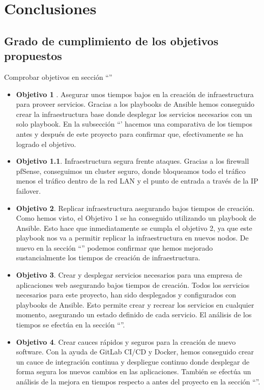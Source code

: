 \chapter {Conclusiones}

\section{Grado de cumplimiento de los objetivos propuestos}
\begin{text}
	Comprobar objetivos en sección ``''
\end{text}
\begin{itemize}
        \item \textbf{Objetivo 1 }. Asegurar unos tiempos bajos en la creación de infraestructura para proveer servicios. Gracias a los playbooks de Ansible hemos conseguido crear la infraestructura base donde desplegar los servicios necesarios con un solo playbook. En la subsección ``' hacemos una comparativa de los tiempos antes y después de este proyecto para confirmar que, efectivamente se ha logrado el objetivo.
        \item \textbf{Objetivo 1.1}. Infraestructura segura frente ataques. Gracias a los firewall pfSense, conseguimos un cluster seguro, donde bloqueamos todo el tráfico menos el tráfico dentro de la red LAN y el punto de entrada a través de la IP failover. 
        \item \textbf{Objetivo 2}. Replicar infraestructura asegurando bajos tiempos de creación. Como hemos visto, el Objetivo 1 se ha conseguido utilizando un playbook de Ansible. Esto hace que inmediatamente se cumpla el objetivo 2, ya que este playbook nos va a permitir replicar la infraestructura en nuevos nodos. De nuevo en la sección ``'' podemos confirmar que hemos mejorado sustancialmente los tiempos de creación de infraestructura.
        \item \textbf{Objetivo 3}. Crear y desplegar servicios necesarios para una empresa de aplicaciones web asegurando bajos tiempos de creación. Todos los servicios necesarios para este proyecto, han sido desplegados y configurados con playbooks de Ansible. Esto permite crear y recrear los servicios en cualquier momento, asegurando un estado definido de cada servicio. El análisis de los tiempos se efectúa en la sección ``''.
        \item \textbf{Objetivo 4}. Crear cauces rápidos y seguros para la creación de nuevo software. Con la ayuda de GitLab CI/CD y Docker, hemos conseguido crear un cauce de integración continua y despliegue continuo donde desplegar de forma segura los nuevos cambios en las aplicaciones. También se efectúa un análisis de la mejora en tiempos respecto a antes del proyecto en la sección ``''.
\end{itemize}

